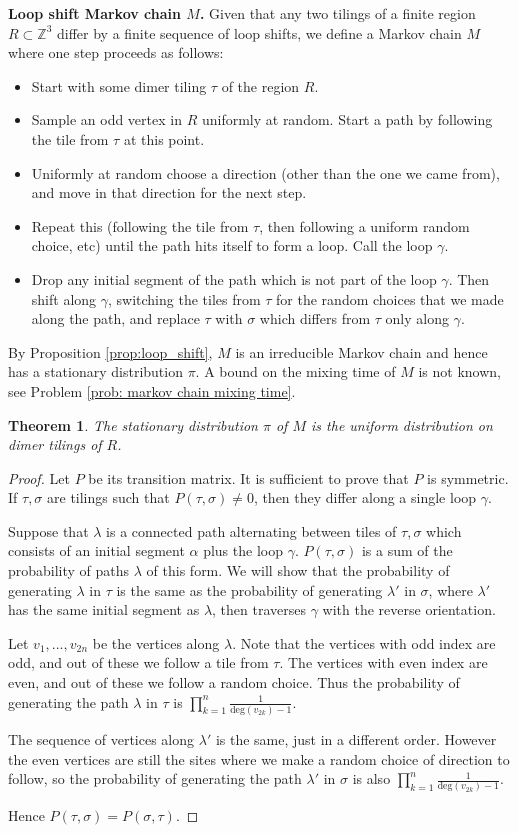 \documentclass[11pt]{article}
\newtheorem{thm}{Theorem}[subsection]
\theoremstyle{remark}
\theoremstyle{definition}
\begin{document}
\textbf{Loop shift Markov chain $M$.} Given that any two tilings of a finite region $R\subset \mathbb{Z}^3$ differ by a finite sequence of loop shifts, we define a Markov chain $M$ where one step proceeds as follows: 
\begin{itemize}
    \item Start with some dimer tiling $\tau$ of the region $R$. 
    \item Sample an odd vertex in $R$ uniformly at random. Start a path by following the tile from $\tau$ at this point. 
    \item Uniformly at random choose a direction (other than the one we came from), and move in that direction for the next step. 
    \item Repeat this (following the tile from $\tau$, then following a uniform random choice, etc) until the path hits itself to form a loop. Call the loop $\gamma$.
    \item Drop any initial segment of the path which is not part of the loop $\gamma$. Then shift along $\gamma$, switching the tiles from $\tau$ for the random choices that we made along the path, and replace $\tau$ with $\sigma$ which differs from $\tau$ only along $\gamma$. 
\end{itemize}
By Proposition \ref{prop:loop_shift}, $M$ is an irreducible Markov chain and hence has a stationary distribution $\pi$. A bound on the mixing time of $M$ is not known, see Problem \ref{prob: markov chain mixing time}. 
\begin{thm}
The stationary distribution $\pi$ of $M$ is the uniform distribution on dimer tilings of $R$. 
\end{thm}
\begin{proof}
 Let $P$ be its transition matrix. It is sufficient to prove that $P$ is symmetric. If $\tau,\sigma$ are tilings such that $P(\tau,\sigma) \neq 0$, then they differ along a single loop $\gamma$. 

Suppose that $\lambda$ is a connected path alternating between tiles of $\tau,\sigma$ which consists of an initial segment $\alpha$ plus the loop $\gamma$. $P(\tau,\sigma)$ is a sum of the probability of paths $\lambda$ of this form. We will show that the probability of generating $\lambda$ in $\tau$ is the same as the probability of generating $\lambda'$ in $\sigma$, where $\lambda'$ has the same initial segment as $\lambda$, then traverses $\gamma$ with the reverse orientation. 

Let $v_1,...,v_{2n}$ be the vertices along $\lambda$. Note that the vertices with odd index are odd, and out of these we follow a tile from $\tau$. The vertices with even index are even, and out of these we follow a random choice. Thus the probability of generating the path $\lambda$ in $\tau$ is $\prod_{k=1}^n \frac{1}{\text{deg}(v_{2k})-1}$. 

The sequence of vertices along $\lambda'$ is the same, just in a different order. However the even vertices are still the sites where we make a random choice of direction to follow, so the probability of generating the path $\lambda'$ in $\sigma$ is also $\prod_{k=1}^n \frac{1}{\text{deg}(v_{2k})-1}$. 

Hence $P(\tau,\sigma) = P(\sigma, \tau)$. 
\end{proof}
\end{document}
